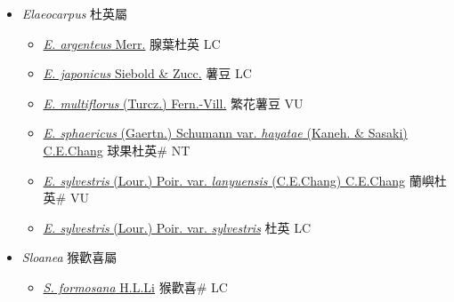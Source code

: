 
  \begin{itemize}
 \item[] \textit{Elaeocarpus} 杜英屬
                    
  \begin{itemize}
        \item[] \href{http://www.theplantlist.org/tpl1.1/search?q=Elaeocarpus+argenteus}{\textit{E. argenteus} Merr.}   腺葉杜英 LC
        \item[] \href{http://www.theplantlist.org/tpl1.1/search?q=Elaeocarpus+japonicus}{\textit{E. japonicus} Siebold \& Zucc.}   薯豆 LC
        \item[] \href{http://www.theplantlist.org/tpl1.1/search?q=Elaeocarpus+multiflorus}{\textit{E. multiflorus} (Turcz.) Fern.-Vill.}   繁花薯豆 VU
        \item[] \href{http://www.theplantlist.org/tpl1.1/search?q=Elaeocarpus+sphaericus+var.+hayatae}{\textit{E. sphaericus} (Gaertn.) Schumann var. \textit{hayatae} (Kaneh. \& Sasaki) C.E.Chang}   球果杜英\# NT
        \item[] \href{http://www.theplantlist.org/tpl1.1/search?q=Elaeocarpus+sylvestris+var.+lanyuensis}{\textit{E. sylvestris} (Lour.) Poir. var. \textit{lanyuensis} (C.E.Chang) C.E.Chang}   蘭嶼杜英\# VU
        \item[] \href{http://www.theplantlist.org/tpl1.1/search?q=Elaeocarpus+sylvestris+var.+sylvestris}{\textit{E. sylvestris} (Lour.) Poir. var. \textit{sylvestris}}   杜英 LC
  \end{itemize}
 \item[] \textit{Sloanea} 猴歡喜屬
                    
  \begin{itemize}
        \item[] \href{http://www.theplantlist.org/tpl1.1/search?q=Sloanea+formosana}{\textit{S. formosana} H.L.Li}   猴歡喜\# LC
  \end{itemize}
  \end{itemize}

